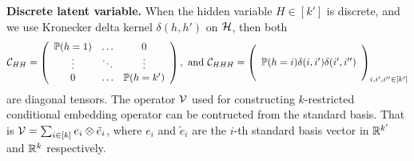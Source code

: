\documentclass{article}
\begin{document}
{\bf Discrete latent variable.} When the hidden variable $H \in [k']$ is discrete, and we use Kronecker delta kernel $\delta(h,h')$ on $\mathcal{H}$, then both
\begin{align}
 \mathcal{C}_{HH} = \left(
  \begin{array}{ccc}
    \mathbb{P}(h=1) & \ldots & 0 \cr
    \vdots & \ddots & \vdots \cr
    0 & \ldots & \mathbb{P}(h=k')
  \end{array}
 \right),
 ~\text{and}~
 \mathcal{C}_{HHH} = \left(
  \begin{array}{c}
    \cr
    \mathbb{P}(h=i) \delta(i,i') \delta(i',i'') \cr
    \cr
  \end{array}
 \right)_{i,i',i''\in[k']}
\end{align}
are diagonal tensors. The operator $\mathcal{V}$ used for constructing $k$-restricted conditional embedding operator can be contructed from the standard basis. That is $\mathcal{V} = \sum_{i \in [k]} e_i \otimes \tilde e_i$, where $e_i$ and $\tilde e_i$ are the $i$-th standard basis vector in $\mathbb{R}^{k'}$ and $\mathbb{R}^k$ respectively.

\end{document}
